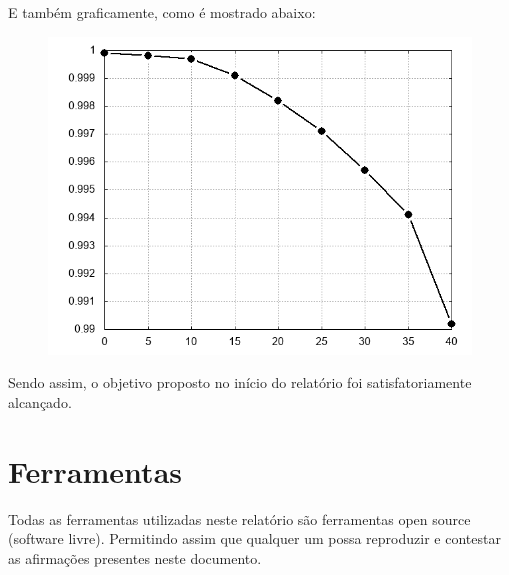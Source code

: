 \documentclass[12pt, hidelinks]{article}
\begin{document}
\newpage
E também graficamente, como é mostrado abaixo:
\begin{figure}[!h]
  \centering
  \includegraphics[width=12cm]{figuras/graph.png}\\
\end{figure}

Sendo assim, o objetivo proposto no início do relatório foi satisfatoriamente alcançado.

\newpage
\section{Ferramentas}
Todas as ferramentas utilizadas neste relatório são ferramentas open source (software livre).
Permitindo assim que qualquer um possa reproduzir e contestar as afirmações presentes neste documento.
\end{document}
